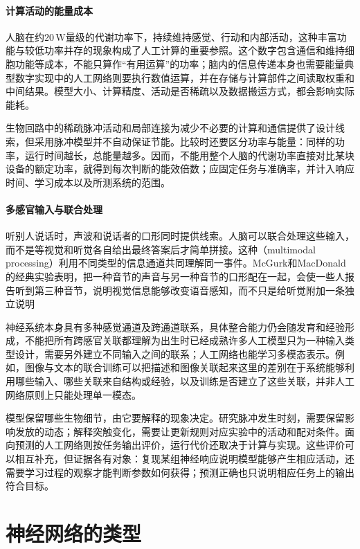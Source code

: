 \paragraph{计算活动的能量成本}
人脑在约$20\,\mathrm{W}$量级的代谢功率下，持续维持感觉、行动和内部活动，这种丰富功能与较低功率并存的现象构成了人工计算的重要参照。这个数字包含通信和维持细胞功能等成本，不能只算作“有用运算”的功率；脑内的信息传递本身也需要能量典型数字实现中的人工网络则要执行数值运算，并在存储与计算部件之间读取权重和中间结果。模型大小、计算精度、活动是否稀疏以及数据搬运方式，都会影响实际能耗。

生物回路中的稀疏脉冲活动和局部连接为减少不必要的计算和通信提供了设计线索，但采用脉冲模型并不自动保证节能。比较时还要区分功率与能量：同样的功率，运行时间越长，总能量越多。因而，不能用整个人脑的代谢功率直接对比某块设备的额定功率，就得到每次判断的能效倍数；应固定任务与准确率，并计入响应时间、学习成本以及所测系统的范围。

\paragraph{多感官输入与联合处理}
听别人说话时，声波和说话者的口形同时提供线索。人脑可以联合处理这些输入，而不是等视觉和听觉各自给出最终答案后才简单拼接。这种（multimodal processing）利用不同类型的信息通道共同理解同一事件。McGurk和MacDonald的经典实验表明，把一种音节的声音与另一种音节的口形配在一起，会使一些人报告听到第三种音节，说明视觉信息能够改变语音感知，而不只是给听觉附加一条独立说明

神经系统本身具有多种感觉通道及跨通道联系，具体整合能力仍会随发育和经验形成，不能把所有跨感官关联都理解为出生时已经成熟许多人工模型只为一种输入类型设计，需要另外建立不同输入之间的联系；人工网络也能学习多模态表示。例如，图像与文本的联合训练可以把描述和图像关联起来这里的差别在于系统能够利用哪些输入、哪些关联来自结构或经验，以及训练是否建立了这些关联，并非人工网络原则上只能处理单一模态。

模型保留哪些生物细节，由它要解释的现象决定。研究脉冲发生时刻，需要保留影响发放的动态；解释突触变化，需要让更新规则对应实验中的活动和配对条件。面向预测的人工网络则按任务输出评价，运行代价还取决于计算与实现。这些评价可以相互补充，但证据各有对象：复现某组神经响应说明模型能够产生相应活动，还需要学习过程的观察才能判断参数如何获得；预测正确也只说明相应任务上的输出符合目标。

\section{神经网络的类型}
\label{sec:neural-network-types}

